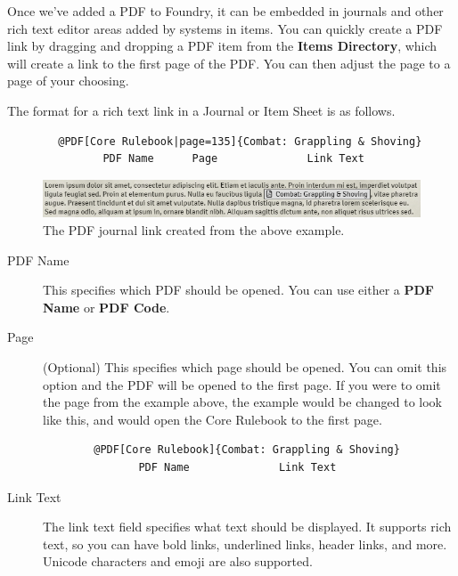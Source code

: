 \documentclass{article}
\begin{document}
    Once we've added a PDF to Foundry, it can be embedded in journals and other rich text editor areas added by systems in items. You can quickly create a PDF link by dragging and dropping a PDF item from the \textbf{Items Directory}, which will create a link to the first page of the PDF. You can then adjust the page to a page of your choosing.

    The format for a rich text link in a Journal or Item Sheet is as follows.

    \begin{verbatim}
        @PDF[Core Rulebook|page=135]{Combat: Grappling & Shoving}
               PDF Name      Page              Link Text
    \end{verbatim}

    \begin{figure}[h]
        \centering
        \includegraphics[width=1\textwidth]{images/rich-text-link-example.png}
        \caption{The PDF journal link created from the above example.}
        \label{rich-text-link-example}
    \end{figure}

    \begin{description}

        \item [PDF Name] This specifies which PDF should be opened. You can use either a \textbf{PDF Name} or \textbf{PDF Code}.

        \item [Page] (Optional) This specifies which page should be opened. You can omit this option and the PDF will be opened to the first page. If you were to omit the page from the example above, the example would be changed to look like this, and would open the Core Rulebook to the first page.

        \begin{verbatim}
        @PDF[Core Rulebook]{Combat: Grappling & Shoving}
               PDF Name              Link Text
        \end{verbatim}

        \item [Link Text] The link text field specifies what text should be displayed. It supports rich text, so you can have bold links, underlined links, header links, and more. Unicode characters and emoji are also supported.

    \end{description}
\end{document}
